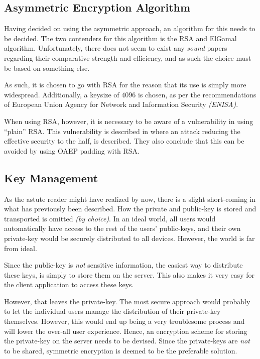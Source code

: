 		\subsection{Asymmetric Encryption Algorithm}
			\label{sec:encryption_choice:rsa_size}
			Having decided on using the asymmetric approach, an algorithm for this needs to be decided. The two contenders for this algorithm is the RSA and ElGamal algorithm. Unfortunately, there does not seem to exist any \emph{sound} papers regarding their comparative strength and efficiency, and as such the choice must be based on something else.

			As such, it is chosen to go with RSA for the reason that its use is simply more widespread. Additionally, a keysize of $4096$ is chosen, as per the recommendations of European Union Agency for Network and Information Security \emph{(ENISA)}\cite[p.37]{enisa}.

			When using RSA, however, it is necessary to be aware of a vulnerability in using ``plain'' RSA. This vulnerability is described in \cite{boneh2000textbook} where an attack reducing the effective security to the half, is described. They also conclude that this can be avoided by using OAEP padding with RSA.

		\subsection{Key Management}
			\label{sec:keys}
			As the astute reader might have realized by now, there is a slight short-coming in what has previously been described. How the private and public-key is stored and transported is omitted \emph{(by choice)}. In an ideal world, all users would automatically have access to the rest of the users' public-keys, and their own private-key would be securely distributed to all devices. However, the world is far from ideal.

			Since the public-key is \emph{not} sensitive information, the easiest way to distribute these keys, is simply to store them on the server. This also makes it very easy for the client application to access these keys.

			However, that leaves the private-key. The most secure approach would probably to let the individual users manage the distribution of their private-key themselves. However, this would end up being a very troublesome process and will lower the over-all user experience. Hence, an encryption scheme for storing the private-key on the server needs to be devised. Since the private-keys are \emph{not} to be shared, symmetric encryption is deemed to be the preferable solution.


